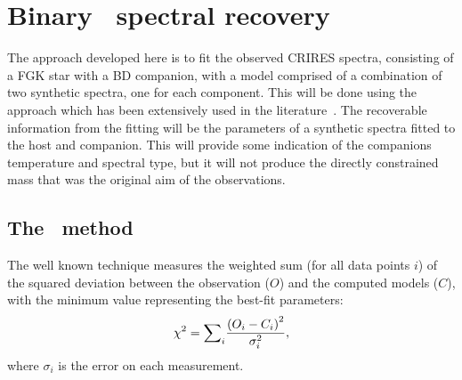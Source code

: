
\section{Binary \texorpdfstring{\textchisquared}{chi-squared}\ spectral recovery}
\label{subsec:companion_recovery}
The approach developed here is to fit the observed CRIRES spectra, consisting of a {FGK} star with a {BD} companion, with a model comprised of a combination of two synthetic spectra, one for each component.
This will be done using the \textchisquared{} approach which has been extensively used in the literature~\citep[e.g.][to list a few]{astudillo-defru_harps_2015, passegger_fundamental_2016, passegger_carmenes_2018, zechmeister_spectrum_2018, nemravova_xtauri_2016, kolbl_detection_2015, rajpurohit_exploring_2018}.
The recoverable information from the fitting will be the parameters of a synthetic spectra fitted to the host and companion.
This will provide some indication of the companions temperature and spectral type, but it will not produce the directly constrained mass that was the original aim of the observations.

\subsection{The \texorpdfstring{\textchisquared{}}{chi-squared}\ method}
\label{subsec:chi2}

The well known \textchisquared{} technique measures the weighted sum (for all data points \(i\)) of the squared deviation between the observation (\({O}\)) and the computed models (\({C}\)), with the minimum \textchisquared{} value representing the best-fit parameters:
\begin{equation}
{\chi}^{2}{} = {\sum}_i \frac{{(O_{i} - {C}_{i})}^2}{{\sigma}_{i}^{2}},
\end{equation}
where \({\sigma}_{i}\) is the error on each measurement.

